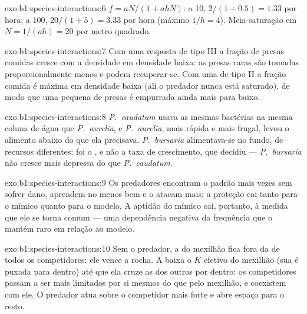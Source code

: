 \begin{solution}{exo:b1:species-interactions:6}
$f = aN/(1 + ahN)$: a 10, $2/(1 + 0.5) = 1.33$ por hora; a 100,
$20/(1 + 5) = 3.33$ por hora (máximo $1/h = 4$). Meia-saturação em
$N = 1/(ah) = 20$ por metro quadrado.
\end{solution}

\begin{solution}{exo:b1:species-interactions:7}
Com uma resposta de tipo III a fração de presas comidas cresce com a
densidade em densidade baixa: as presas raras são tomadas
proporcionalmente menos e podem recuperar-se. Com uma de tipo II a
fração comida é máxima em densidade baixa (ali o predador nunca está
saturado), de modo que uma  pequena de presas é empurrada
ainda mais para baixo.
\end{solution}

\begin{solution}{exo:b1:species-interactions:8}
\emph{P.~caudatum} usava as mesmas bactérias na mesma coluna de água
que \emph{P.~aurelia}, e \emph{P.~aurelia}, mais rápida e mais frugal,
levou o alimento abaixo do que ela precisava. \emph{P.~bursaria}
alimentava-se no fundo, de recursos diferentes: foi o , e não a
taxa de crescimento, que decidiu --- \emph{P.~bursaria} não cresce
mais depressa do que \emph{P.~caudatum}.
\end{solution}

\begin{solution}{exo:b1:species-interactions:9}
Os predadores encontram o padrão mais vezes sem sofrer dano, aprendem-no
menos bem e o atacam mais: a proteção cai tanto para o mímico quanto
para o modelo. A aptidão do mímico cai, portanto, à medida que ele se
torna comum --- uma dependência negativa da frequência que o mantém
raro em relação ao modelo.
\end{solution}

\begin{solution}{exo:b1:species-interactions:10}
Sem o predador, a  do mexilhão fica fora da de todos os
competidores: ele vence a rocha. A  baixa o $K$ efetivo do
mexilhão (sua  é puxada para dentro) até que ela cruze as
 dos outros por dentro: os competidores passam a ser mais
limitados por si mesmos do que pelo mexilhão, e coexistem com ele. O
predador atua sobre o competidor mais forte e abre espaço para o resto.
\end{solution}

